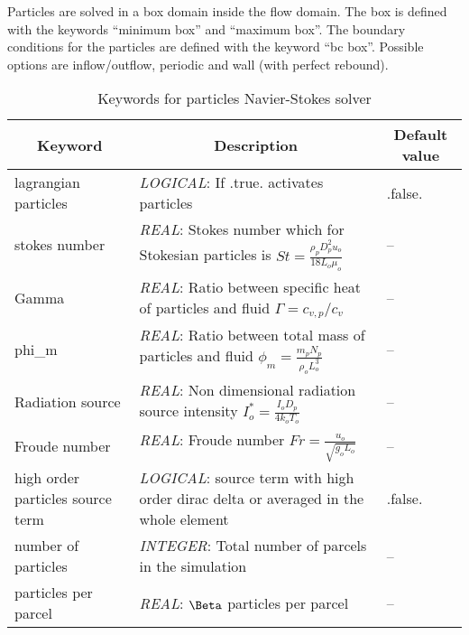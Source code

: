 \documentclass[a4paper,10pt]{report}
\begin{document}
Particles are solved in a box domain inside the flow domain. The box is defined with the keywords ``minimum box'' and ``maximum box''. The boundary conditions for the particles are defined with the keyword ``bc box''. Possible options are inflow/outflow, periodic and wall (with perfect rebound). 

\begin{table}[htbp]
    \caption{Keywords for particles Navier-Stokes solver}
    \begin{tabular}{|l|p{10cm}|p{2.2cm}|}
    \hline
    \multicolumn{1}{|c|}{Keyword} & \multicolumn{1}{c|}{Description} & \multicolumn{1}{c|}{Default value} \\ \hline
    lagrangian particles                & \textit{LOGICAL}: If .true. activates particles & .false. \\ \hline
    stokes number                       & \textit{REAL}: Stokes number which for Stokesian particles is $St=\frac{\rho_p D_p^2 u_o}{18 L_o \mu_o}$  & -- \\ \hline
    Gamma                               & \textit{REAL}: Ratio between specific heat of particles and fluid $\Gamma=c_{v,p}/c_{v}$ & -- \\ \hline
    phi\_m                               & \textit{REAL}: Ratio between total mass of particles and fluid $\phi_m=\frac{m_p N_p}{\rho_o L_o^3}$  & -- \\ \hline
    Radiation source                    & \textit{REAL}: Non dimensional radiation source intensity $I_o^*=\frac{I_o D_p}{4k_oT_o}$   & -- \\ \hline
    Froude number                       & \textit{REAL}: Froude number $Fr=\frac{u_o}{\sqrt{g_o L_o}}$  & -- \\ \hline
    high order particles source term    & \textit{LOGICAL}: source term with high order dirac delta or averaged in the whole element  & .false. \\ \hline
    number of particles                 & \textit{INTEGER}: Total number of parcels in the simulation & -- \\ \hline
    particles per parcel                & \textit{REAL}: $\Beta$ particles per parcel & -- \\ \hline

    \end{tabular}
    \label{tab:PartKey1}
    \end{table}
\end{document}

